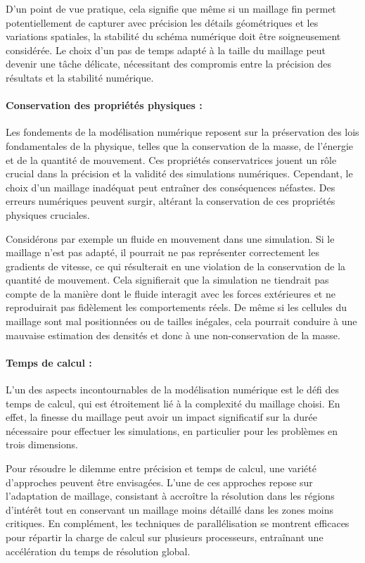 D'un point de vue pratique, cela signifie que même si un maillage fin permet potentiellement de capturer avec précision les détails géométriques et les variations spatiales, la stabilité du schéma numérique doit être soigneusement considérée. Le choix d'un pas de temps adapté à la taille du maillage peut devenir une tâche délicate, nécessitant des compromis entre la précision des résultats et la stabilité numérique.


\paragraph{Conservation des propriétés physiques :}

Les fondements de la modélisation numérique reposent sur la préservation des lois fondamentales de la physique, telles que la conservation de la masse, de l'énergie et de la quantité de mouvement. Ces propriétés conservatrices jouent un rôle crucial dans la précision et la validité des simulations numériques. Cependant, le choix d'un maillage inadéquat peut entraîner des conséquences néfastes. Des erreurs numériques peuvent surgir, altérant la conservation de ces propriétés physiques cruciales.

Considérons par exemple un fluide en mouvement dans une simulation. Si le maillage n'est pas adapté, il pourrait ne pas représenter correctement les gradients de vitesse, ce qui résulterait en une violation de la conservation de la quantité de mouvement. Cela signifierait que la simulation ne tiendrait pas compte de la manière dont le fluide interagit avec les forces extérieures et ne reproduirait pas fidèlement les comportements réels. De même si les cellules du maillage sont mal positionnées ou de tailles inégales, cela pourrait conduire à une mauvaise estimation des densités et donc à une non-conservation de la masse.

\paragraph{Temps de calcul :}

L'un des aspects incontournables de la modélisation numérique est le défi des temps de calcul, qui est étroitement lié à la complexité du maillage choisi. En effet, la finesse du maillage peut avoir un impact significatif sur la durée nécessaire pour effectuer les simulations, en particulier pour les problèmes en trois dimensions.

Pour résoudre le dilemme entre précision et temps de calcul, une variété d'approches peuvent être envisagées. L'une de ces approches repose sur l'adaptation de maillage, consistant à accroître la résolution dans les régions d'intérêt tout en conservant un maillage moins détaillé dans les zones moins critiques. En complément, les techniques de parallélisation se montrent efficaces pour répartir la charge de calcul sur plusieurs processeurs, entraînant une accélération du temps de résolution global.

